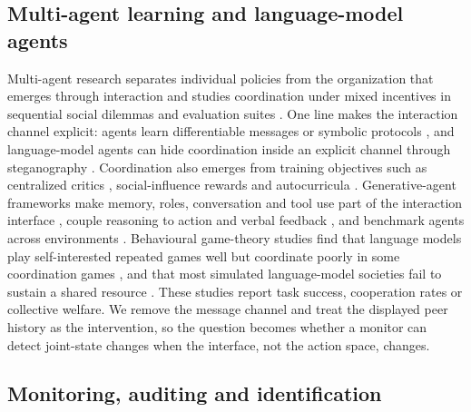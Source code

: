 \documentclass[sigconf,review,anonymous]{acmart}
\begin{document}
\subsection{Multi-agent learning and language-model agents}

Multi-agent research separates individual policies from the organization that emerges through interaction \cite{stone2000multiagent,busoniu2008comprehensive} and studies coordination under mixed incentives in sequential social dilemmas and evaluation suites \cite{leibo2017multiagent,leibo2021meltingpot}. One line makes the interaction channel explicit: agents learn differentiable messages or symbolic protocols \cite{foerster2016communicate,sukhbaatar2016commnet,havrylov2017emergence}, and language-model agents can hide coordination inside an explicit channel through steganography \cite{motwani2024secret}. Coordination also emerges from training objectives such as centralized critics \cite{lowe2017maddpg}, social-influence rewards \cite{jaques2019social} and autocurricula \cite{baker2020tooluse}. Generative-agent frameworks make memory, roles, conversation and tool use part of the interaction interface \cite{park2023generative,li2023camel,wu2023autogen}, couple reasoning to action and verbal feedback \cite{yao2023react,shinn2023reflexion}, and benchmark agents across environments \cite{liu2024agentbench}. Behavioural game-theory studies find that language models play self-interested repeated games well but coordinate poorly in some coordination games \cite{akata2025playing}, and that most simulated language-model societies fail to sustain a shared resource \cite{piatti2024cooperate}. These studies report task success, cooperation rates or collective welfare. We remove the message channel and treat the displayed peer history as the intervention, so the question becomes whether a monitor can detect joint-state changes when the interface, not the action space, changes.

\subsection{Monitoring, auditing and identification}
\end{document}
